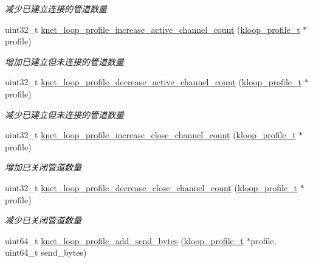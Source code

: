 \begin{DoxyCompactItemize}
\begin{DoxyCompactList}\small\item\em 减少已建立连接的管道数量 \end{DoxyCompactList}\item 
uint32\+\_\+t \hyperlink{a00079_abb04cdf84772d003486afde6ee2f5234_abb04cdf84772d003486afde6ee2f5234}{knet\+\_\+loop\+\_\+profile\+\_\+increase\+\_\+active\+\_\+channel\+\_\+count} (\hyperlink{a00051_ab75a5c23099a6118c469ed160b277f28_ab75a5c23099a6118c469ed160b277f28}{kloop\+\_\+profile\+\_\+t} $\ast$profile)
\begin{DoxyCompactList}\small\item\em 增加已建立但未连接的管道数量 \end{DoxyCompactList}\item 
uint32\+\_\+t \hyperlink{a00079_a2846784b57c724b18c09aa177c1d1905_a2846784b57c724b18c09aa177c1d1905}{knet\+\_\+loop\+\_\+profile\+\_\+decrease\+\_\+active\+\_\+channel\+\_\+count} (\hyperlink{a00051_ab75a5c23099a6118c469ed160b277f28_ab75a5c23099a6118c469ed160b277f28}{kloop\+\_\+profile\+\_\+t} $\ast$profile)
\begin{DoxyCompactList}\small\item\em 减少已建立但未连接的管道数量 \end{DoxyCompactList}\item 
uint32\+\_\+t \hyperlink{a00079_a85fbddaf0bf20c228f7389ad2765ec57_a85fbddaf0bf20c228f7389ad2765ec57}{knet\+\_\+loop\+\_\+profile\+\_\+increase\+\_\+close\+\_\+channel\+\_\+count} (\hyperlink{a00051_ab75a5c23099a6118c469ed160b277f28_ab75a5c23099a6118c469ed160b277f28}{kloop\+\_\+profile\+\_\+t} $\ast$profile)
\begin{DoxyCompactList}\small\item\em 增加已关闭管道数量 \end{DoxyCompactList}\item 
uint32\+\_\+t \hyperlink{a00079_a1c0e93ef936d34b9ed9eb0b8a949a888_a1c0e93ef936d34b9ed9eb0b8a949a888}{knet\+\_\+loop\+\_\+profile\+\_\+decrease\+\_\+close\+\_\+channel\+\_\+count} (\hyperlink{a00051_ab75a5c23099a6118c469ed160b277f28_ab75a5c23099a6118c469ed160b277f28}{kloop\+\_\+profile\+\_\+t} $\ast$profile)
\begin{DoxyCompactList}\small\item\em 减少已关闭管道数量 \end{DoxyCompactList}\item 
uint64\+\_\+t \hyperlink{a00079_abd775461437b9c394cf7b800953ea6d0_abd775461437b9c394cf7b800953ea6d0}{knet\+\_\+loop\+\_\+profile\+\_\+add\+\_\+send\+\_\+bytes} (\hyperlink{a00051_ab75a5c23099a6118c469ed160b277f28_ab75a5c23099a6118c469ed160b277f28}{kloop\+\_\+profile\+\_\+t} $\ast$profile, uint64\+\_\+t send\+\_\+bytes)

\end{DoxyCompactItemize}
